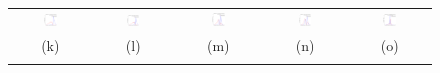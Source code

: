 \begin{figure}[t]
\begin{tabular}{@{}c c c c c@{}}
\includegraphics[width=0.18\textwidth]{figs/synthetic/syn_lines_g2d_responses_cdf_0} &
\includegraphics[width=0.18\textwidth]{figs/synthetic/syn_lines_g2d_responses_cdf_1} &
\includegraphics[width=0.18\textwidth]{figs/synthetic/syn_lines_g2d_responses_cdf_2} &
\includegraphics[width=0.18\textwidth]{figs/synthetic/syn_lines_g2d_responses_cdf_3} &
\includegraphics[width=0.18\textwidth]{figs/retina/ret_vessels_g2d_responses_cdf}  \\
(k) & (l) & (m) & (n) & (o)\\
\noalign{\smallskip}


\end{tabular}
\end{figure}
